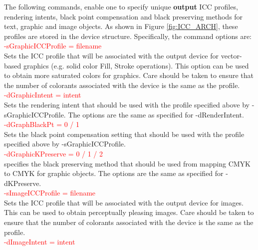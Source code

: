 \documentclass[12pt,notitlepage]{article}
\begin{document}
The following commands, enable one to specify unique {\bf output} ICC profiles, rendering intents, black point compensation and black preserving methods for text, graphic and image objects.  As shown in Figure \ref{fig:ICC_ARCH}, these profiles are stored in the device structure.  Specifically, the command options are:\\

\textcolor{red}{-sGraphicICCProfile = filename}\\

\noindent Sets the ICC profile that will be associated with the output device for vector-based graphics (e.g. solid color Fill, Stroke operations). This option can be used to obtain more saturated colors for graphics.  Care should be taken to ensure that the number of colorants associated with the device is the same as the profile. \\

\textcolor{red}{-dGraphicIntent = intent}\\

\noindent Sets the rendering intent that should be used with the profile specified above by -sGraphicICCProfile. The options are the same as specified for -dRenderIntent.\\

\textcolor{red}{-dGraphBlackPt = 0 / 1}\\

\noindent Sets the black point compensation setting that should be used with the profile specified above by -sGraphicICCProfile.\\

\textcolor{red}{-dGraphicKPreserve = 0 / 1 / 2}\\

\noindent specifies the black preserving method that should be used from mapping CMYK to CMYK for graphic objects.   The
options are the same as specified for -dKPreserve.\\

\textcolor{red}{-sImageICCProfile = filename}\\

\noindent Sets the ICC profile that will be associated with the output device for images.  This can be used to obtain perceptually pleasing images.
Care should be taken to ensure that the number of colorants associated with the device is the same as the profile. \\

\textcolor{red}{-dImageIntent = intent}\\
\end{document}
